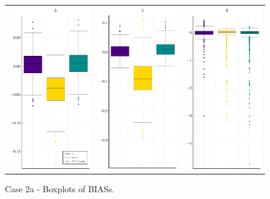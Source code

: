 \begin{figure}[H] 
	\centering
	\begin{tabular}[b]{c c c}
		\includegraphics[width=.3\textwidth]{Figures/2a/BIAS_b.pdf} & \includegraphics[width=.3\textwidth]{Figures/2a/BIAS_a.pdf} & \includegraphics[width=.3\textwidth]{Figures/2a/BIAS_t.pdf}
	\end{tabular}
	\caption{Case 2a - Boxplots of BIASs.}
	\label{fig:bpBIAS2a}
\end{figure}
